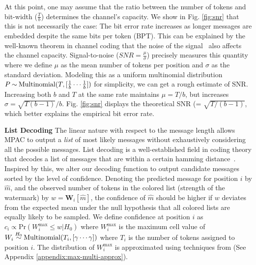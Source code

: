 At this point, one may assume that the ratio between the number of tokens and bit-width ($\frac{T}{b}$) determines the channel's capacity. We show in Fig. \ref{fig:snr} that this is not necessarily the case: The bit error rate increases as longer messages are embedded despite the same bits per token (BPT). This can be explained by the well-known theorem in channel coding that the noise of the signal~\citep{shannon1948mathematical} also affects the channel capacity. Signal-to-noise ($SNR=\frac{\mu}{\sigma}$) precisely measures this quantity where we define $\mu$ as the mean number of tokens per position and $\sigma$ as the standard deviation. Modeling this as a uniform multinomial distribution $P\distas{} \text{Multinomial}(T, [\frac{1}{b} \cdots \frac{1}{b}])$ for simplicity, we can get a rough estimate of SNR. Increasing both $b$ and $T$ at the same rate maintains $\mu = T/b$, but increases $\sigma = \sqrt{T(b-1)}/b$. Fig. \ref{fig:snr} displays the theoretical SNR (= $\sqrt{T/(b-1)}$, which better explains the empirical bit error rate. %




\noindent \textbf{List Decoding}
The linear nature with respect to the message length allows MPAC to output a \textit{list} of most likely messages without exhaustively considering all the possible messages. List decoding is a well-established field in coding theory that decodes a list of messages that are within a certain hamming distance~\citep{elias1991error, guruswami2008explicit, guruswami2004list}.
Inspired by this, we alter our decoding function to output candidate messages sorted by the level of confidence. Denoting the predicted message for position $i$ by $\hat{m}$, and the observed number of tokens in the colored list (strength of the watermark) by $w=\mathbf{W}_{i}[\hat{m}]$, the confidence of $\hat{m}$ should be higher if $w$ deviates from the expected mean under the null hypothesis that all colored lists are equally likely to be sampled. We define confidence at position $i$ as $c_i \propto {\text{Pr}(W^{\text{max}}_{i} \leq w | H_0)}$ where $W^\text{max}_i$ is the maximum cell value of $W_i\distas{H_0}\text{Multinomial}(T_i, [\gamma \cdots \gamma])$ where $T_i$ is the number of tokens assigned to position $i$. The distribution of $W^\text{max}_i$ is approximated using techniques from \citet{levin1981representation} (See Appendix \ref{appendix:max-multi-approx}).

